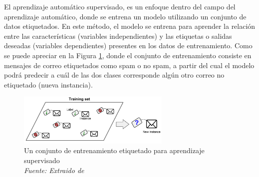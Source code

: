 El aprendizaje automático supervisado, es un enfoque dentro del campo del aprendizaje automático, donde se entrena un modelo utilizando un conjunto de datos etiquetados. En este método, el modelo se entrena para aprender la relación entre las características (variables independientes) y las etiquetas o salidas deseadas (variables dependientes) presentes en los datos de entrenamiento. Como se puede apreciar en la Figura \ref{fig:an8}, donde el conjunto de entrenamiento consiste en mensajes de correo etiquetados como spam o no spam, a partir del cual el modelo podrá predecir a cuál de las dos clases corresponde algún otro correo no etiquetado (nueva instancia). 

\begin{figure}
	\includegraphics[width=0.65\textwidth]{capitulo2/figuras/an8.png}
	\caption{Un conjunto de entrenamiento etiquetado para aprendizaje supervisado
		\\\textit{Fuente: Extraido de  \protect\cite[p.8]{geron2019hands} }}
	\label{fig:an8}
\end{figure}